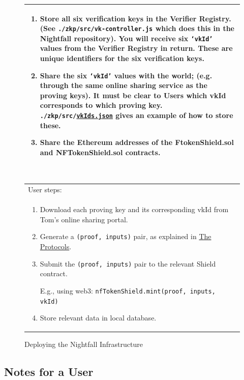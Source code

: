 \documentclass{article}
\newcounter{ongoingEnumCounter}%
\begin{document}
\begin{figure}[H]
\begin{center}
\begin{framed}
\begin{tabular}{p{16cm}}
\begin{enumerate}
          \item Store all six verification keys in the Verifier Registry. (See \texttt{./zkp/src/vk-controller.js} which does this in the Nightfall repository). You will receive six \texttt{`vkId'} values from the Verifier Registry in return. These are unique identifiers for the six verification keys.
          \item Share the six \texttt{`vkId'} values with the world; (e.g. through the same online sharing service as the proving keys). It must be clear to Users which vkId corresponds to which proving key. \texttt{./zkp/src/\hyperref[sec:zkp]{vkIds.json}} gives an example of how to store these.
          \item Share the Ethereum addresses of the FtokenShield.sol and NFTokenShield.sol contracts.

          \setcounter{ongoingEnumCounter}{\value{enumi}}
        \end{enumerate}
        \ \\
        \hline
        User steps:\\
        \begin{enumerate}
          \setcounter{enumi}{\value{ongoingEnumCounter}}
          \item Download each proving key and its corresponding vkId from Tom's online sharing portal.
          \item Generate a \texttt{(proof, inputs)} pair, as explained in \hyperref[part:theProtocols]{The Protocols}.
          \item Submit the \texttt{(proof, inputs)} pair to the relevant Shield contract.

          E.g., using web3: \texttt{nfTokenShield.mint(proof, inputs, vkId)}
          \item Store relevant data in local database.
          \setcounter{ongoingEnumCounter}{0}
        \end{enumerate}
			\end{tabular}
		\end{framed}
	\end{center}
\caption{Deploying the Nightfall Infrastructure}
\label{fig:trustedSetup}
\end{figure}


\subsection*{Notes for a User}
\end{document}
